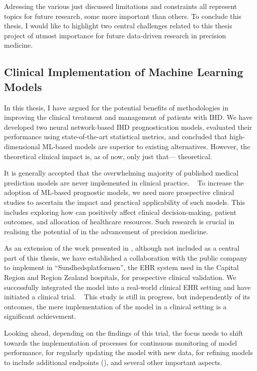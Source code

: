 Adressing the various just discussed limitations and constraints
all represent topics for future research, some more important than others.
To conclude this thesis, I would like to highlight two central challenges
related to this thesis project of utmost importance for future data-driven 
research in precision medicine.

\subsection{Clinical Implementation of Machine Learning Models}

In this thesis, I have argued for the potential benefits of 
methodologies in improving the clinical treatment and management of patients
with \ac{IHD}. We have developed two neural network-based \ac{IHD}
prognostication models, evaluated their performance using state-of-the-art
statistical metrics, and concluded that high-dimensional \ac{ML}-based
models are superior to existing alternatives.
However, the theoretical clinical impact is, as of now, only just that---%
theoretical. 

It is generally accepted that
the overwhelming majority of published medical prediction models 
are never implemented in clinical practice.
~\autocite{steyerbergPrognosis2013}
To increase the adoption of \ac{ML}-based prognostic models, 
we need more prospective clinical studies to ascertain 
the impact and practical applicability of such models.
This includes exploring how  can positively   
affect clinical decision-making, patient outcomes, and 
allocation of healthcare resources.
Such research is crucial in realising the potential of 
 in the advancement of precision medicine.

As an extension of the work presented in \studyii{},
although not included as a central part of this thesis,
we have established a collaboration with the public company 
 to implement  in \enquote{Sundhedsplatformen}, 
the \ac{EHR} system used in the Capital Region and Region Zealand hospitals,
for prospective clinical validation.
We successfully integrated the model into a real-world clinical \ac{EHR}
setting and have initiated a clinical trial.
~\autocite{bundgaardClinical2023} This study is still in progress, but
independently of its outcomes, the mere implementation of the model in a
clinical setting is a significant achievement.

Looking ahead, depending on the findings of this trial,
the focus needs to shift towards the implementation of processes
for continuous monitoring of model performance, for regularly updating
the model with new data, for refining models to include additional 
endpoints (), and several other important aspects.

